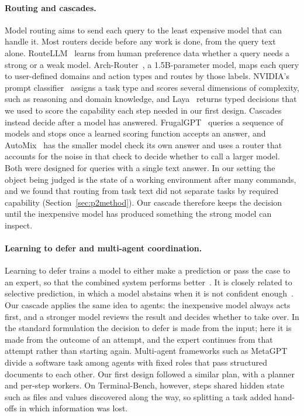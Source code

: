 \paragraph{Routing and cascades.}
Model routing aims to send each query to the least expensive model that can handle it. Most routers decide
before any work is done, from the query text alone. RouteLLM~\cite{ong2024routellm} learns from human preference
data whether a query needs a strong or a weak model. Arch-Router~\cite{tran2025archrouter}, a 1.5B-parameter
model, maps each query to user-defined domains and action types and routes by those labels. NVIDIA's prompt
classifier~\cite{nvidia2026classifier} assigns a task type and scores several dimensions of complexity, such as
reasoning and domain knowledge, and Laya~\cite{laya2026} returns typed decisions that we used to score the
capability each step needed in our first design. Cascades instead decide after a model has answered.
FrugalGPT~\cite{chen2023frugalgpt} queries a sequence of models and stops once a learned scoring function
accepts an answer, and AutoMix~\cite{aggarwal2024automix} has the smaller model check its own answer and uses a
router that accounts for the noise in that check to decide whether to call a larger model. Both were designed
for queries with a single text answer. In our setting the object being judged is the state of a working
environment after many commands, and we found that routing from task text did not separate tasks by required
capability (Section~\ref{sec:p2method}). Our cascade therefore keeps the decision until the inexpensive model
has produced something the strong model can inspect.

\paragraph{Learning to defer and multi-agent coordination.}
Learning to defer trains a model to either make a prediction or pass the case to an expert, so that the
combined system performs better~\cite{madras2018predict,mozannar2020consistent}. It is
closely related to selective prediction, in which a model abstains when it is not confident
enough~\cite{geifman2017selective}. Our cascade applies the same idea to agents: the inexpensive model always
acts first, and a stronger model reviews the result and decides whether to take over. In the standard formulation the
decision to defer is made from the input; here it is made from the outcome of an attempt, and the expert
continues from that attempt rather than starting again. Multi-agent frameworks such as MetaGPT~\cite{hong2024metagpt} divide a software task among
agents with fixed roles that pass structured documents to each other. Our first design followed a similar plan,
with a planner and per-step workers. On Terminal-Bench, however, steps shared hidden state such as files and
values discovered along the way, so splitting a task added hand-offs in which information was lost.

